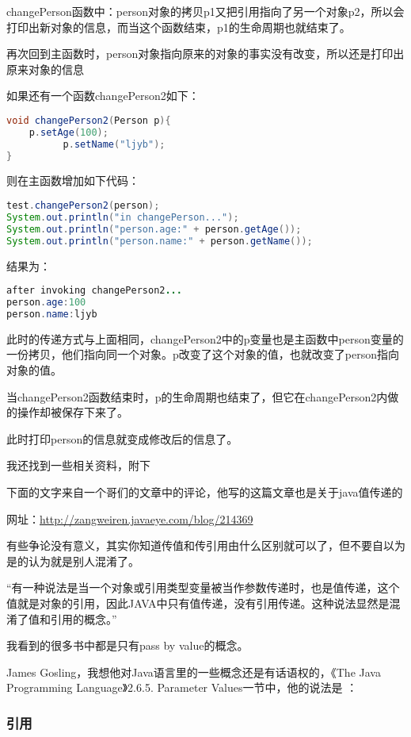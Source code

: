 \documentclass[10pt,b5paper]{article}
\begin{document}
changePerson函数中：person对象的拷贝p1又把引用指向了另一个对象p2，所以会打印出新对象的信息，而当这个函数结束，p1的生命周期也就结束了。 

再次回到主函数时，person对象指向原来的对象的事实没有改变，所以还是打印出原来对象的信息 

如果还有一个函数changePerson2如下：
\begin{lstlisting}[language=java]
void changePerson2(Person p){
    p.setAge(100);
          p.setName("ljyb");
}
\end{lstlisting}

则在主函数增加如下代码：
\begin{lstlisting}[language=java]
test.changePerson2(person);
System.out.println("in changePerson...");
System.out.println("person.age:" + person.getAge());
System.out.println("person.name:" + person.getName());
\end{lstlisting}
结果为： 
\begin{lstlisting}[language=java]
after invoking changePerson2... 
person.age:100 
person.name:ljyb 
\end{lstlisting}
此时的传递方式与上面相同，changePerson2中的p变量也是主函数中person变量的一份拷贝，他们指向同一个对象。p改变了这个对象的值，也就改变了person指向对象的值。 

当changePerson2函数结束时，p的生命周期也结束了，但它在changePerson2内做的操作却被保存下来了。 

此时打印person的信息就变成修改后的信息了。 

我还找到一些相关资料，附下 

下面的文字来自一个哥们的文章中的评论，他写的这篇文章也是关于java值传递的 

网址：\url{http://zangweiren.javaeye.com/blog/214369} 

有些争论没有意义，其实你知道传值和传引用由什么区别就可以了，但不要自以为是的认为就是别人混淆了。 

“有一种说法是当一个对象或引用类型变量被当作参数传递时，也是值传递，这个值就是对象的引用，因此JAVA中只有值传递，没有引用传递。这种说法显然是混淆了值和引用的概念。” 

我看到的很多书中都是只有pass by value的概念。 

James Gosling，我想他对Java语言里的一些概念还是有话语权的，《The Java Programming Language》2.6.5. Parameter Values一节中，他的说法是 ：
\subsubsection{引用}
\label{sec-1-5-5}
\end{document}
